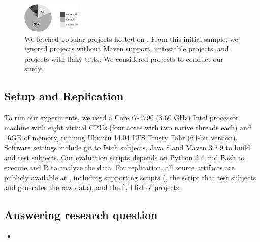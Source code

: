\vspace{-1ex}
\begin{figure}[ht]
    \centering
    \includegraphics[width=0.25\textwidth]{plots/subjs.pdf}
    \caption{\label{fig:subjects}We fetched \SubjectsGithub{} popular
    projects hosted on \github{}. From this initial sample, we ignored
    \SubjectsGithubNotMaven{} projects without Maven support,
    \SubjectsGithubNotTestable{} untestable projects, and
    \SubjectsGithubFlaky{} projects with flaky tests. We considered
    \numSubjs{} projects to conduct our study.}
\end{figure}
\vspace{-2ex}

\subsection{Setup and Replication}
\label{sec:setup}

To run our experiments, we used a Core i7-4790 (3.60 GHz) Intel
processor machine with eight virtual CPUs (four cores with two native
threads each) and 16GB of memory, running Ubuntu 14.04 LTS Trusty Tahr
(64-bit version).  Software settings include git to fetch subjects,
Java 8 and Maven 3.3.9 to build and test subjects. Our evaluation
scripts depends on Python 3.4 and Bash to execute and R to analyze the
data.  For replication, all source artifacts are publicly available at
, including supporting scripts (\eg, the script
that test subjects and generates the raw data), and the full list of
projects. 

\subsection{Answering research question \numRQA{}}
\label{sec:rqA}

\begin{itemize}
    \item \emph{\RQA}
\end{itemize}

